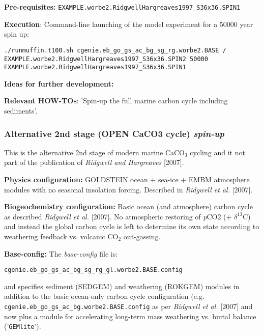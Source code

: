 \documentclass[10pt,twoside]{article}
\begin{document}
\noindent \textbf{Pre-requisites:} \texttt{EXAMPLE.worbe2.RidgwellHargreaves1997\_S36x36.SPIN1}

\noindent \textbf{Execution}: Command-line launching of the model experiment for a 50000 year spin up:
\vspace{-10pt}\small\begin{verbatim}
./runmuffin.t100.sh cgenie.eb_go_gs_ac_bg_sg_rg.worbe2.BASE / 
EXAMPLE.worbe2.RidgwellHargreaves1997_S36x36.SPIN2 50000 
EXAMPLE.worbe2.RidgwellHargreaves1997_S36x36.SPIN1
\end{verbatim}\normalsize\vspace{-10pt}

\noindent \textbf{Ideas for further development:} 

\noindent \textbf{Relevant HOW-TOs}: 'Spin-up the full marine carbon cycle including sediments'.


\subsubsection{Alternative 2nd stage (OPEN CaCO3 cycle) \textit{spin-up}}\label{EXAMPLE.worbe2.RidgwellHargreaves1997_S36x36.SPIN2gl}

This is the alternative 2nd stage of modern marine CaCO$_{3}$ cycling and it not part of the publication of \textit{Ridgwell and Hargreaves} [2007].

\noindent \textbf{Physics configuration:} GOLDSTEIN ocean + sea-ice + EMBM atmosphere modules with no seasonal insolation forcing. Described in \textit{Ridgwell et al.} [2007].

\noindent \textbf{Biogeochemistry configuration:} Basic ocean (and atmosphere) carbon cycle as described \textit{Ridgwell et al.} [2007]. No atmospheric restoring of \textit{p}CO2 (+ $\delta^{13}$C) and instead the global carbon cycle is left to determine its own state according to weathering feedback vs. volcanic CO$_{2}$ out-gassing.

\noindent \textbf{Base-config:} The \textit{base-config} file is:
\vspace{-10pt}\begin{verbatim}cgenie.eb_go_gs_ac_bg_sg_rg_gl.worbe2.BASE.config\end{verbatim}\vspace{-10pt}
and specifies sediment (SEDGEM) and weathering (ROKGEM) modules in addition to the basic ocean-only carbon cycle configuration (e.g. \texttt{cgenie.eb\_go\_gs\_ac\_bg.worbe2.BASE.config} as per \textit{Ridgwell et al.} [2007] and now plus a module for accelerating long-term mass weathering vs. burial balance ('\texttt{GEMlite}').
\end{document}
